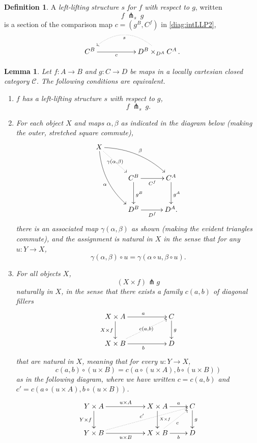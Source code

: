 \documentclass[12pt]{article}
\newtheorem{lemma}[theorem]{Lemma}
\theoremstyle{definition}
\newtheorem{definition}[theorem]{Definition}
\begin{document}
\begin{definition}\label{def:LLP}
A \emph{left-lifting structure $s$ for $f$ with respect to $g$}, written
$$f\ \pitchfork_s\ g$$
is a section of the comparison map $c = (g^B, C^f)$ in \eqref{diag:intLLP2}, 
\begin{equation}
\xymatrix{
C^B \ar[rr]_-{c} && D^B\times_{D^A} C^A  \ar@/_{2pc}/@{.>}[ll]^{s}\,.
}
\end{equation}
\end{definition}

\begin{lemma}\label{lem:extintLLP}
Let $f : A\to B$ and $g : C\to D$ be maps in a locally cartesian closed category $\mathcal{C}$.
The following conditions are equivalent.
\begin{enumerate}
%
\item\label{lem:intLLP} $f$ has a left-lifting structure $s$ with respect to $g$, 
$$f\ \pitchfork_s\ g.$$
 
\item\label{lem:expLLP} For each object $X$ and maps $\alpha, \beta$ as indicated in the diagram below (making the outer, stretched square commute), 
\begin{equation}\label{diag:expLLP}
\xymatrix@=3em{
X \ar@/{}_{1pc}/[rdd]_{\alpha}  \ar@{.>}[rd]|-{\gamma(\alpha,\beta)} \ar@/{}^{1pc}/[rrd]^{\beta} & & \\
	& C^B \ar[d]^{g^B} \ar[r]_{C^f} 	& C^A \ar[d]^{g^A} \\
	& D^B \ar[r]_{D^f} 				& D^A.
}
\end{equation}
there is an associated map $\gamma(\alpha,\beta)$ as shown (making the evident triangles commute), and the assignment is natural in $X$ in the sense that for any $u : Y\to X$,
\[
\gamma(\alpha,\beta)\circ u = \gamma(\alpha\circ u,\beta\circ u).
\]

%
\item\label{lem:extLLP} For all objects $X$, $$(X\times f) \pitchfork g$$ \emph{naturally in $X$}, in the sense that there exists a family $c(a,b)$ of diagonal fillers
\[
\xymatrix{
X\times A \ar[d]_{X\times f} \ar[rr]^{a} && C \ar[d]^{g} \\
X\times B \ar[rr]_{b} \ar@{.>}[urr]|-{c(a,b)} && D
}
\]
that are natural in $X$, meaning that for every $u : Y \to X$, 
\[
c(a,b)\circ(u\times B) = c(a\circ(u\times A),b\circ(u\times B))
\]
%
as in the following diagram, where we have written $c = c(a,b)$ and $c' = c(a\circ(u\times A),b\circ(u\times B))$.
\begin{equation*}%
\xymatrix{
Y\times A	\ar[rr]^{u\times A} \ar[d]_{Y\times f} && X\times A  \ar[d]^{^{X\times f} } \ar[r]^-a		& C \ar[d]^{g} \\
Y\times B \ar[rr]_{u\times B} \ar@{.>}[urrr]^{c'}  && X\times B  \ar@{.>}[ur]_{c} \ar[r]_-b	& D
}
\end{equation*}
%
\end{enumerate}
\end{lemma}
\end{document}
